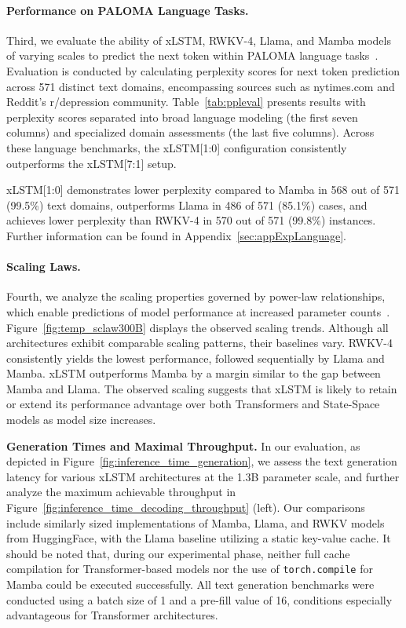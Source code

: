 \paragraph{Performance on PALOMA Language Tasks.} Third, we evaluate the ability of xLSTM, RWKV-4, Llama, and Mamba models of varying scales to predict the next token within PALOMA language tasks~\citep{Magnusson:23arxivshort}. Evaluation is conducted by calculating perplexity scores for next token prediction across 571 distinct text domains, encompassing sources such as nytimes.com and Reddit’s r/depression community. Table~\ref{tab:ppleval} presents results with perplexity scores separated into broad language modeling (the first seven columns) and specialized domain assessments (the last five columns). Across these language benchmarks, the xLSTM[1:0] configuration consistently outperforms the xLSTM[7:1] setup.

xLSTM[1:0] demonstrates lower perplexity compared to Mamba in 568 out of 571 (99.5\%) text domains, outperforms Llama in 486 of 571 (85.1\%) cases, and achieves lower perplexity than RWKV-4 in 570 out of 571 (99.8\%) instances. Further information can be found in Appendix~\ref{sec:appExpLanguage}.

\paragraph{Scaling Laws.} Fourth, we analyze the scaling properties governed by power-law relationships, which enable predictions of model performance at increased parameter counts~\citep{Kaplan:20,Brown:20short}. Figure~\ref{fig:temp_sclaw300B} displays the observed scaling trends. Although all architectures exhibit comparable scaling patterns, their baselines vary. RWKV-4 consistently yields the lowest performance, followed sequentially by Llama and Mamba. xLSTM outperforms Mamba by a margin similar to the gap between Mamba and Llama. The observed scaling suggests that xLSTM is likely to retain or extend its performance advantage over both Transformers and State-Space models as model size increases.

\textbf{Generation Times and Maximal Throughput.} In our evaluation, as depicted in Figure~\ref{fig:inference_time_generation}, we assess the text generation latency for various xLSTM architectures at the 1.3B parameter scale, and further analyze the maximum achievable throughput in Figure~\ref{fig:inference_time_decoding_throughput} (left). Our comparisons include similarly sized implementations of Mamba, Llama, and RWKV models from HuggingFace, with the Llama baseline utilizing a static key-value cache. It should be noted that, during our experimental phase, neither full cache compilation for Transformer-based models nor the use of \texttt{torch.compile} for Mamba could be executed successfully. All text generation benchmarks were conducted using a batch size of 1 and a pre-fill value of 16, conditions especially advantageous for Transformer architectures.

